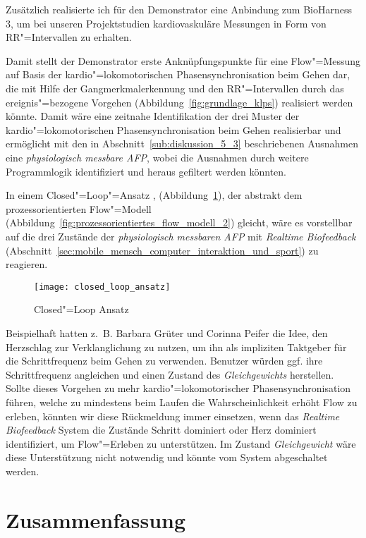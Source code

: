 Zusätzlich realisierte ich für den Demonstrator eine Anbindung zum BioHarness 3, um bei unseren Projektstudien \citep{Grueter2016a} kardiovaskuläre Messungen in Form von RR"=Intervallen zu erhalten.

Damit stellt der Demonstrator erste Anknüpfungspunkte für eine Flow"=Messung auf Basis der kardio"=lokomotorischen Phasensynchronisation beim Gehen dar, die mit Hilfe der Gangmerkmalerkennung und den RR"=Intervallen durch das ereignis"=bezogene Vorgehen (Abbildung~\ref{fig:grundlage_klps}) realisiert werden könnte. Damit wäre eine zeitnahe Identifikation der drei Muster der kardio"=lokomotorischen Phasensynchronisation beim Gehen realisierbar und ermöglicht mit den in Abschnitt~\ref{sub:diskussion_5_3} beschriebenen Ausnahmen eine \emph{physiologisch messbare \ac{AFP}}, wobei die Ausnahmen durch weitere Programmlogik identifiziert und heraus gefiltert werden könnten. 

In einem Closed"=Loop"=Ansatz \citep[][S.~474]{Calvo2015}, (Abbildung~\ref{fig:closed_loop_ansatz}), der abstrakt dem prozessorientierten Flow"=Modell (Abbildung~\ref{fig:prozessorientiertes_flow_modell_2}) gleicht, wäre es vorstellbar auf die drei Zustände der \emph{physiologisch messbaren \ac{AFP}} mit \emph{Realtime Biofeedback} (Abschnitt~\ref{sec:mobile_mensch_computer_interaktion_und_sport}) zu reagieren. 
\begin{figure}
	[!htb] \centering 
	\texttt{[image: closed\_loop\_ansatz]} \caption[Closed"=Loop Ansatz]{Closed"=Loop Ansatz} \label{fig:closed_loop_ansatz} 
\end{figure}

Beispielhaft hatten z.~B. Barbara Grüter und Corinna Peifer die Idee, den Herzschlag zur Verklanglichung zu nutzen, um ihn als impliziten Taktgeber für die Schrittfrequenz beim Gehen zu verwenden. Benutzer würden ggf. ihre Schrittfrequenz angleichen und einen Zustand des \emph{Gleichgewichts} herstellen. Sollte dieses Vorgehen zu mehr kardio"=lokomotorischer Phasensynchronisation führen, welche zu mindestens beim Laufen die Wahrscheinlichkeit erhöht Flow zu erleben, könnten wir diese Rückmeldung immer einsetzen, wenn das \emph{Realtime Biofeedback} System die Zustände {Schritt dominiert} oder {Herz dominiert} identifiziert, um Flow"=Erleben zu unterstützen. Im Zustand \emph{Gleichgewicht} wäre diese Unterstützung nicht notwendig und könnte vom System abgeschaltet werden. 

\section{Zusammenfassung} 

